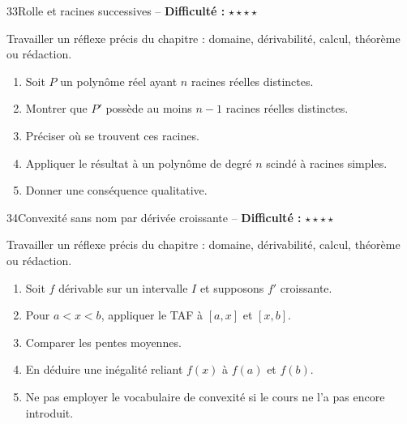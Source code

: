 \documentclass[11pt,a4paper]{article}
\newcommand{\etoiles}[1]{\textbf{Difficulté :} #1}
\begin{document}
\begin{exobox}{33}{Rolle et racines successives -- \etoiles{$\star\star\star\star$}}

\begin{objectifbox}
Travailler un réflexe précis du chapitre : domaine, dérivabilité, calcul, théorème ou rédaction.
\end{objectifbox}

\begin{enumerate}

\item Soit $P$ un polynôme réel ayant $n$ racines réelles distinctes.

\item Montrer que $P'$ possède au moins $n-1$ racines réelles distinctes.

\item Préciser où se trouvent ces racines.

\item Appliquer le résultat à un polynôme de degré $n$ scindé à racines simples.

\item Donner une conséquence qualitative.

\end{enumerate}

\end{exobox}


\begin{exobox}{34}{Convexité sans nom par dérivée croissante -- \etoiles{$\star\star\star\star$}}

\begin{objectifbox}
Travailler un réflexe précis du chapitre : domaine, dérivabilité, calcul, théorème ou rédaction.
\end{objectifbox}

\begin{enumerate}

\item Soit $f$ dérivable sur un intervalle $I$ et supposons $f'$ croissante.

\item Pour $a<x<b$, appliquer le TAF à $[a,x]$ et $[x,b]$.

\item Comparer les pentes moyennes.

\item En déduire une inégalité reliant $f(x)$ à $f(a)$ et $f(b)$.

\item Ne pas employer le vocabulaire de convexité si le cours ne l'a pas encore introduit.

\end{enumerate}

\end{exobox}
\end{document}
